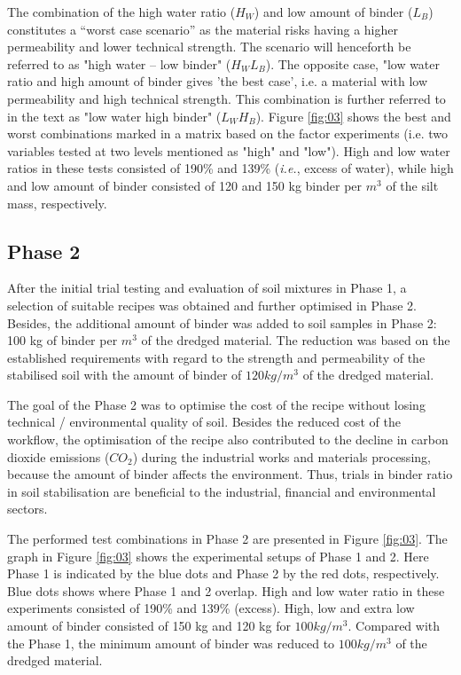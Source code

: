 \documentclass{amestyle}
\begin{document}
The combination of the high water ratio ($H_W$) and low amount of binder ($L_B$) constitutes a “worst case scenario” as the material risks having a higher permeability and lower technical strength. The scenario will henceforth be referred to as "high water -- low binder" ($H_WL_B$). The opposite case, "low water ratio and high amount of binder gives 'the best case', i.e. a material with low permeability and high technical strength. This combination is further referred to in the text as "low water high binder" ($L_WH_B$). Figure \ref{fig:03} shows the best and worst combinations marked in a matrix based on the factor experiments (i.e. two variables tested at two levels mentioned as "high" and "low"). High and low water ratios in these tests consisted of 190\% and 139\% (\emph{i.e.}, excess of water), while high and low amount of binder consisted of 120 and 150 kg binder per $m^3$ of the silt mass, respectively. 

\subsection{Phase 2}

After the initial trial testing and evaluation of soil mixtures in Phase 1, a selection of suitable recipes was obtained and further optimised in Phase 2. Besides, the additional amount of binder was added to soil samples in Phase 2: 100 kg of binder per $m^3$ of the dredged material. The reduction was based on the established requirements with regard to the strength and permeability of the stabilised soil with the amount of binder of $120 kg/m^3$ of the dredged material. 

The goal of the Phase 2 was to optimise the cost of the recipe without losing technical / environmental quality of soil. Besides the reduced cost of the workflow, the optimisation of the recipe also contributed to the decline in carbon dioxide emissions ($CO_2$) during the industrial works and materials processing, because the amount of binder affects the environment. Thus, trials in binder ratio in soil stabilisation are beneficial to the industrial, financial and environmental sectors.

The performed test combinations in Phase 2 are presented in Figure \ref{fig:03}. The graph in Figure \ref{fig:03} shows the experimental setups of Phase 1 and 2. Here Phase 1 is indicated by the blue dots and Phase 2 by the red dots, respectively. Blue dots shows where Phase 1 and 2 overlap. High and low water ratio in these experiments consisted of 190\% and 139\% (excess). High, low and extra low amount of binder consisted of 150 kg and 120 kg for $100 kg/m^3$. Compared with the Phase 1, the minimum amount of binder was reduced to $100 kg/m^3$ of the dredged material. 
\end{document}
